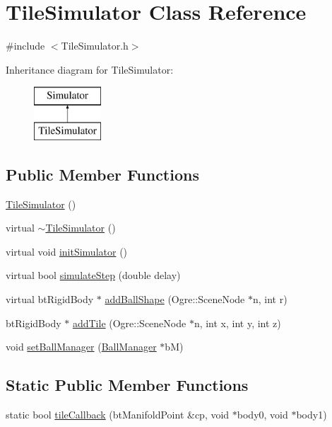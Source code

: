 \hypertarget{classTileSimulator}{\section{Tile\-Simulator Class Reference}
\label{classTileSimulator}
}


{\ttfamily \#include $<$Tile\-Simulator.\-h$>$}

Inheritance diagram for Tile\-Simulator\-:\begin{figure}[H]
\begin{center}
\leavevmode
\includegraphics[height=2.000000cm]{classTileSimulator}
\end{center}
\end{figure}
\subsection*{Public Member Functions}
\begin{DoxyCompactItemize}
\item 
\hyperlink{classTileSimulator_a96ab96c82b83362c9249c30afd9c8a73}{Tile\-Simulator} ()
\item 
virtual \hyperlink{classTileSimulator_ae888f7fa1ad73f5876edd70719e99e5c}{$\sim$\-Tile\-Simulator} ()
\item 
virtual void \hyperlink{classTileSimulator_a952f2493568e720f37331119084f9dd3}{init\-Simulator} ()
\item 
virtual bool \hyperlink{classTileSimulator_ae944141e1051b803018d6c4af47f2df9}{simulate\-Step} (double delay)
\item 
virtual bt\-Rigid\-Body $\ast$ \hyperlink{classTileSimulator_ad1db783060a2d2af92e614042cab0767}{add\-Ball\-Shape} (Ogre\-::\-Scene\-Node $\ast$n, int r)
\item 
bt\-Rigid\-Body $\ast$ \hyperlink{classTileSimulator_af5290bb6e13b9c9dccced4d275b7cac7}{add\-Tile} (Ogre\-::\-Scene\-Node $\ast$n, int x, int y, int z)
\item 
void \hyperlink{classTileSimulator_a6c90f655f570b9c80642007c6c97f1aa}{set\-Ball\-Manager} (\hyperlink{classBallManager}{Ball\-Manager} $\ast$b\-M)
\end{DoxyCompactItemize}
\subsection*{Static Public Member Functions}
\begin{DoxyCompactItemize}
\item 
static bool \hyperlink{classTileSimulator_abe7afed920e22486c1a19e162a601bca}{tile\-Callback} (bt\-Manifold\-Point \&cp, void $\ast$body0, void $\ast$body1)
\end{DoxyCompactItemize}
